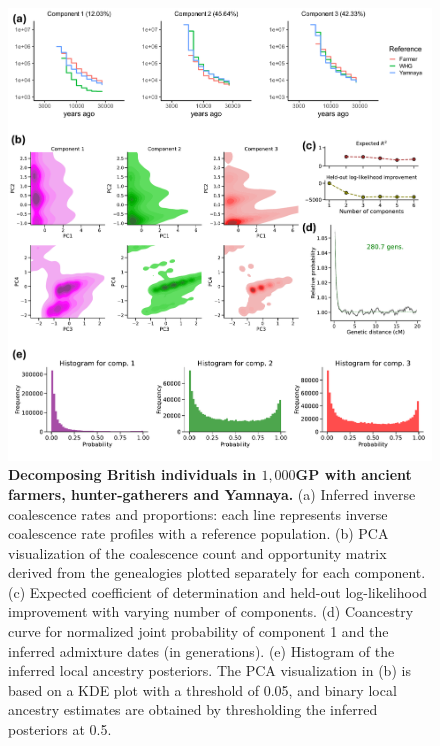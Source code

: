\begin{figure}[h!]
    \centering
    \includegraphics[width=\linewidth]{figures/gb_sims/gb_real_3way_europe.pdf}
    \captionsetup{width=\textwidth+3cm}
    \caption{
    \footnotesize
    \textbf{Decomposing British individuals in $1{,}000$GP with ancient farmers, hunter-gatherers and Yamnaya.} (a) Inferred inverse coalescence rates and proportions: each line represents inverse coalescence rate profiles with a reference population. (b) PCA visualization of the coalescence count and opportunity matrix derived from the genealogies plotted separately for each component. (c) Expected coefficient of determination and held-out log-likelihood improvement with varying number of components. (d) Coancestry curve for normalized joint probability of component 1 and the inferred admixture dates (in generations). (e) Histogram of the inferred local ancestry posteriors. The PCA visualization in (b) is based on a KDE plot with a threshold of 0.05, and binary local ancestry estimates are obtained by thresholding the inferred posteriors at 0.5.
    }
    \label{fig:gb_eur_3way}
\end{figure}


